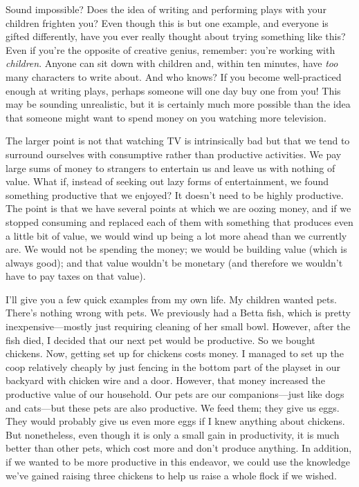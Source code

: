 Sound impossible? Does the idea of writing and performing plays with
your children frighten you?  Even though this is but one example,
and everyone is gifted differently, have you ever really thought
about trying something like this? Even if you’re the opposite of
creative genius, remember: you’re working with \textit{children}.
Anyone can sit down with children and, within ten minutes, have
\textit{too} many characters to write about. And who knows? If you become
well-practiced enough at writing plays, perhaps someone will one day
buy one from you!  This may be sounding unrealistic, but it is
certainly much more possible than the idea that someone might want to
spend money on you watching more television.

The larger point is not that watching TV is intrinsically bad but that
we tend to surround ourselves with consumptive rather than productive
activities. We pay large sums of money to strangers to entertain us and
leave us with nothing of value. What if, instead of seeking out lazy
forms of entertainment, we found something productive that we enjoyed? 
It doesn’t need to be highly productive. The point is that we have
several points at which we are oozing money, and if we stopped
consuming and replaced each of them with something that produces even a
little bit of value, we would wind up being a lot more ahead than we currently are. We
would not be spending the money; we would be building value (which is
always good); and that value wouldn’t be monetary (and therefore we
wouldn't have to pay taxes on that value).  

I’ll give you a few quick examples from my own life. My children wanted
pets. There’s nothing wrong with pets. We previously had a Betta fish,
which is pretty inexpensive---mostly just requiring cleaning of her small
bowl. However, after the fish died, I decided that our next pet would
be productive. So we bought chickens. Now, getting set up for chickens
costs money. I managed to set up the coop relatively cheaply by just
fencing in the bottom part of the playset in our backyard with chicken
wire and a door. However, that money increased the productive value of
our household. Our pets are our companions---just like dogs and cats---but
these pets are also productive. We feed them; they give us eggs. They
would probably give us even more eggs if I knew anything about
chickens. But nonetheless, even though it is only a small gain in
productivity, it is much better than other pets, which cost more and
don’t produce anything. In addition, if we wanted to be more productive
in this endeavor, we could use the knowledge we’ve gained raising three
chickens to help us raise a whole flock if we wished.

